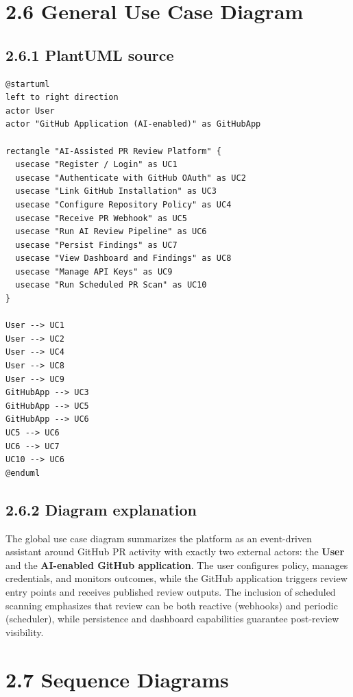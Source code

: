 \section{2.6 General Use Case Diagram}

\subsection{2.6.1 PlantUML source}

\begin{lstlisting}[caption={General use case diagram (PlantUML source)},label={lst:global_use_case}]
@startuml
left to right direction
actor User
actor "GitHub Application (AI-enabled)" as GitHubApp

rectangle "AI-Assisted PR Review Platform" {
  usecase "Register / Login" as UC1
  usecase "Authenticate with GitHub OAuth" as UC2
  usecase "Link GitHub Installation" as UC3
  usecase "Configure Repository Policy" as UC4
  usecase "Receive PR Webhook" as UC5
  usecase "Run AI Review Pipeline" as UC6
  usecase "Persist Findings" as UC7
  usecase "View Dashboard and Findings" as UC8
  usecase "Manage API Keys" as UC9
  usecase "Run Scheduled PR Scan" as UC10
}

User --> UC1
User --> UC2
User --> UC4
User --> UC8
User --> UC9
GitHubApp --> UC3
GitHubApp --> UC5
GitHubApp --> UC6
UC5 --> UC6
UC6 --> UC7
UC10 --> UC6
@enduml
\end{lstlisting}

\subsection{2.6.2 Diagram explanation}

The global use case diagram summarizes the platform as an event-driven assistant around GitHub PR activity with exactly two external actors: the \textbf{User} and the \textbf{AI-enabled GitHub application}. The user configures policy, manages credentials, and monitors outcomes, while the GitHub application triggers review entry points and receives published review outputs. The inclusion of scheduled scanning emphasizes that review can be both reactive (webhooks) and periodic (scheduler), while persistence and dashboard capabilities guarantee post-review visibility.

\section{2.7 Sequence Diagrams}

